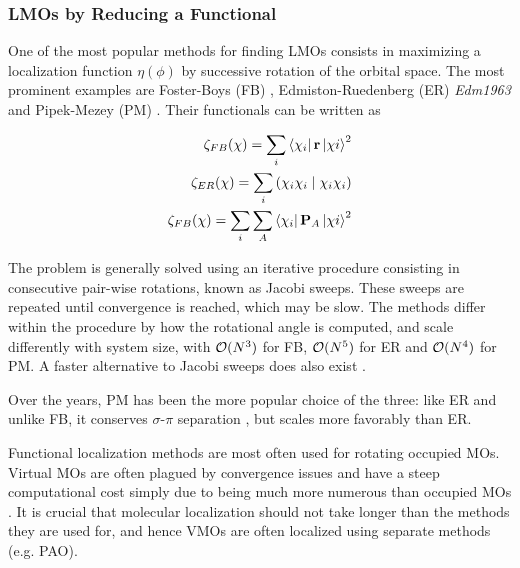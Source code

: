 \subsubsection{LMOs by Reducing a Functional}

One of the most popular methods for finding LMOs consists in maximizing a localization function $\eta(\phi)$ by successive rotation of the orbital space. The most prominent examples are Foster-Boys (FB) \cite{Boy1960}, Edmiston-Ruedenberg (ER) \emph{Edm1963} and Pipek-Mezey (PM) \cite{Pip1989}. Their functionals can be written as

\begin{eqnarray}
\zeta_{FB}(\chi) = \sum_i \bra{\chi_i} \mathbf{r} \ket{\chi i}^2 \\
\zeta_{ER}(\chi) = \sum_i \left( \chi_i \chi_i \mid \chi_i \chi_i \right) \\
\zeta_{FB}(\chi) = \sum_i \sum_A \bra{\chi_i} \mathbf{P}_A \ket{\chi i}^2 
\end{eqnarray}

The problem is generally solved using an iterative procedure consisting in consecutive pair-wise rotations, known as Jacobi sweeps. These sweeps are repeated until convergence is reached, which may be slow. The methods differ within the procedure by how the rotational angle is computed, and scale differently with system size, with $\mathcal{O}(N^{3})$ for FB, $\mathcal{O}(N^{5})$ for ER and $\mathcal{O}(N^{4})$ for PM. A faster alternative to Jacobi sweeps does also exist \cite{Sub2004}. 

Over the years, PM has been the more popular choice of the three: like ER and unlike FB, it conserves $\sigma$-$\pi$ separation \cite{Aqu2006}, but scales more favorably than ER.

Functional localization methods are most often used for rotating occupied MOs. Virtual MOs are often plagued by convergence issues and have a steep computational cost simply due to being much more numerous than occupied MOs \cite{Sub2005}. It is crucial that molecular localization should not take longer than the methods they are used for, and hence VMOs are often localized using separate methods (e.g. PAO).

